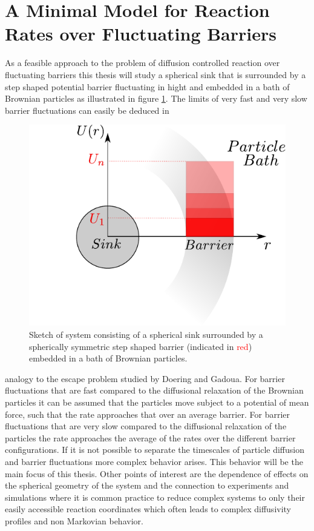 \section{A Minimal Model for Reaction Rates over Fluctuating Barriers}
\label{mini_model}
As a feasible approach to the problem of diffusion controlled reaction over fluctuating barriers this thesis will study a spherical sink that is surrounded by a step shaped potential barrier fluctuating in hight and embedded in a bath of Brownian particles as illustrated in figure \ref{introSketch}. The limits of very fast and very slow barrier fluctuations can easily be deduced in \par
\begin{figure}
    \hspace{-2 cm}\includegraphics[width = 1.1 \textwidth]{plots/IntroSkizze.pdf}
    \caption{Sketch of system consisting of a spherical sink surrounded by a spherically symmetric step shaped barrier (indicated in \textcolor{red}{red}) embedded in a bath of Brownian particles.}
    \label{introSketch}
\end{figure}
analogy to the escape problem studied by Doering and Gadoua.
For barrier fluctuations that are fast compared to the diffusional relaxation of the Brownian particles it can be assumed that the particles move subject to a potential of mean force, such that the rate approaches that over an average barrier. For barrier fluctuations that are very slow compared to the diffusional relaxation of the particles the rate approaches the average of the rates over the different barrier configurations.
If it is not possible to separate the timescales of particle diffusion and barrier fluctuations more complex behavior arises. This behavior will be the main focus of this thesis. 
Other points of interest are the dependence of effects on the spherical geometry of the system and the connection to experiments and simulations where it is common practice to reduce complex systems to only their easily accessible reaction coordinates which often leads to complex diffusivity profiles and non Markovian behavior.

